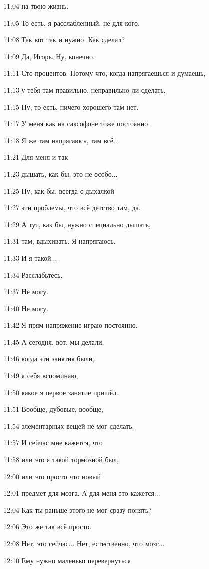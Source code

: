 11:04
на твою жизнь.

11:05
То есть, я расслабленный, не для кого.

11:08
Так вот так и нужно. Как сделал?

11:09
Да, Игорь. Ну, конечно.

11:11
Сто процентов. Потому что, когда напрягаешься и думаешь,

11:13
у тебя там правильно, неправильно ли сделать.

11:15
Ну, то есть, ничего хорошего там нет.

11:17
У меня как на саксофоне тоже постоянно.

11:18
Я же там напрягаюсь, там всё...

11:21
Для меня и так

11:23
дышать, как бы, это не особо...

11:25
Ну, как бы, всегда с дыхалкой

11:27
эти проблемы, что всё детство там, да.

11:29
А тут, как бы, нужно специально дышать,

11:31
там, вдыхивать. Я напрягаюсь.

11:33
И я такой...

11:34
Расслабьтесь.

11:37
Не могу.

11:40
Не могу.

11:42
Я прям напряжение играю постоянно.

11:45
А сегодня, вот, мы делали,

11:46
когда эти занятия были,

11:49
я себя вспоминаю,

11:50
какое я первое занятие пришёл.

11:51
Вообще, дубовые, вообще,

11:54
элементарных вещей не мог сделать.

11:57
И сейчас мне кажется, что

11:58
или это я такой тормозной был,

12:00
или это просто что новый

12:01
предмет для мозга. А для меня это кажется...

12:04
Как ты раньше этого не мог сразу понять?

12:06
Это же так всё просто.

12:08
Нет, это сейчас... Нет, естественно, что мозг...

12:10
Ему нужно маленько перевернуться

